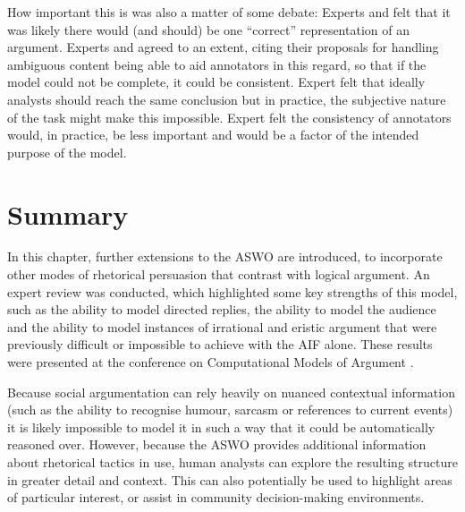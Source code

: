 How important this is was also a matter of some debate: Experts \jodi and \bob felt that it was likely there would (and should) be one ``correct'' representation of an argument. Experts \lizzy and \chris agreed to an extent, citing their proposals for handling ambiguous content being able to aid annotators in this regard, so that if the model could not be complete, it could be consistent. Expert \simon felt that ideally analysts should reach the same conclusion but in practice, the subjective nature of the task might make this impossible. Expert \ash felt the consistency of annotators would, in practice, be less important and would be a factor of the intended purpose of the model.


\section{Summary}   
\label{conclusions}

In this chapter, further extensions to the ASWO are introduced, to incorporate other modes of rhetorical persuasion that contrast with logical argument. An expert review was conducted, which highlighted some key strengths of this model, such as the ability to model directed replies, the ability to model the audience and the ability to model instances of irrational and eristic argument that were previously difficult or impossible to achieve with the AIF alone. These results were presented at the conference on Computational Models of Argument \citep{Blount2016rhetorical}.

Because social argumentation can rely heavily on nuanced contextual information (such as the ability to recognise humour, sarcasm or references to current events) it is likely impossible to model it in such a way that it could be automatically reasoned over. However, because the ASWO provides additional information about rhetorical tactics in use, human analysts can explore the resulting structure in greater detail and context. This can also potentially be used to highlight areas of particular interest, or assist in community decision-making environments.
